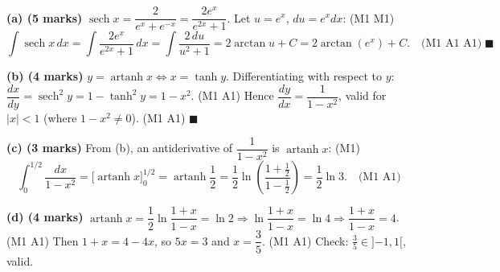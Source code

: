 \documentclass[11pt]{article}
\begin{document}
\begin{corrige}
\textbf{(a) (5 marks)} $\operatorname{sech} x = \dfrac{2}{e^x + e^{-x}} = \dfrac{2e^x}{e^{2x} + 1}$. Let $u = e^x$, $du = e^x dx$: (M1 M1)
\[ \int \operatorname{sech} x\, dx = \int \frac{2e^x}{e^{2x}+1}\, dx = \int \frac{2\, du}{u^2 + 1} = 2\arctan u + C = 2\arctan(e^x) + C. \quad\text{(M1 A1 A1)} \;\blacksquare \]

\textbf{(b) (4 marks)} $y = \operatorname{artanh} x \iff x = \tanh y$. Differentiating with respect to $y$: $\dfrac{dx}{dy} = \operatorname{sech}^2 y = 1 - \tanh^2 y = 1 - x^2$. (M1 A1) Hence $\dfrac{dy}{dx} = \dfrac{1}{1 - x^2}$, valid for $|x| < 1$ (where $1 - x^2 \neq 0$). (M1 A1) $\blacksquare$

\textbf{(c) (3 marks)} From (b), an antiderivative of $\dfrac{1}{1-x^2}$ is $\operatorname{artanh} x$: (M1)
\[ \int_0^{1/2} \frac{dx}{1 - x^2} = \big[\operatorname{artanh} x\big]_0^{1/2} = \operatorname{artanh}\!\frac{1}{2} = \frac{1}{2}\ln\!\left(\frac{1 + \tfrac{1}{2}}{1 - \tfrac{1}{2}}\right) = \frac{1}{2}\ln 3. \quad\text{(M1 A1)} \]

\textbf{(d) (4 marks)} $\operatorname{artanh} x = \dfrac{1}{2}\ln\!\dfrac{1+x}{1-x} = \ln 2 \Rightarrow \ln\dfrac{1+x}{1-x} = \ln 4 \Rightarrow \dfrac{1+x}{1-x} = 4$. (M1 A1) Then $1 + x = 4 - 4x$, so $5x = 3$ and $x = \dfrac{3}{5}$. (M1 A1) Check: $\tfrac{3}{5} \in {}]{-1},1[$, valid.
\end{corrige}
\end{document}
